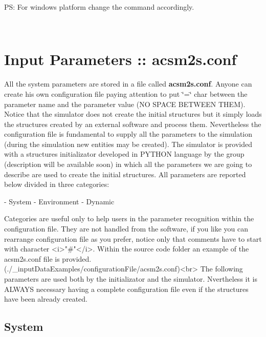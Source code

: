 P\+S\+: For windows platform change the command accordingly.

~\newline
~\newline
 \hypertarget{a00002_parameters}{}\section{Input Parameters \+:: acsm2s.\+conf}\label{a00002_parameters}


 All the system parameters are stored in a file called {\bfseries acsm2s.\+conf}. Anyone can create his own configuration file paying attention to put \char`\"{}=\char`\"{} char between the parameter name and the parameter value (N\+O S\+P\+A\+C\+E B\+E\+T\+W\+E\+E\+N T\+H\+E\+M).~\newline
 Notice that the simulator does not create the initial structures but it simply loads the structures created by an external software and process them. Nevertheless the configuration file is fundamental to supply all the parameters to the simulation (during the simulation new entities may be created). The simulator is provided with a structures initializator developed in P\+Y\+T\+H\+O\+N language by the group (description will be available soon) in which all the parameters we are going to describe are used to create the initial structures. All parameters are reported below divided in three categories\+: \begin{DoxyVerb}           - System
           - Environment
           - Dynamic

           Categories are useful only to help users in the parameter recognition within the configuration file. They are not handled from the software, if you like you can rearrange configuration
           file as you prefer, notice only that comments have to start with character <i>"#"</i>.
           Within the source code folder an example of the acsm2s.conf file is provided. (./_inputDataExamples/configurationFile/acsm2s.conf)<br>
 The following parameters are used both by the initializator and the simulator. Nvertheless it is ALWAYS necessary having a complete configuration file even if the structures have been already created.
\end{DoxyVerb}
 \hypertarget{a00002_paramsystem}{}\subsection{System}\label{a00002_paramsystem}

